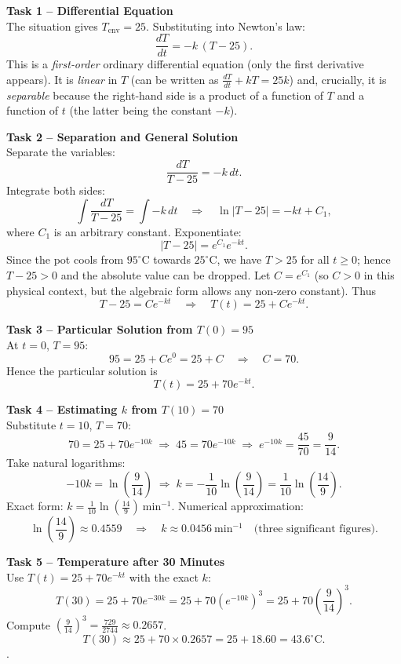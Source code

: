 \documentclass[11pt]{article}
\newcounter{popsec}
\newcounter{popsub}
\newcommand{\courssub}[1]{%
  \stepcounter{popsub}%
  \par\vspace{9pt}\noindent{\popxbold\fontsize{11.5}{13}\selectfont\color{popink}{\color{poporange}\thepopsec.\thepopsub}\hspace{6pt}#1}\par\nopagebreak\vspace{4pt}
}
\begin{document}
\courssub{Model Answer}
\begin{exemplebox}
\textbf{Task 1 – Differential Equation}\\
The situation gives $T_{\text{env}} = 25$. Substituting into Newton's law:
\[
\frac{dT}{dt} = -k\,(T - 25).
\]
This is a \emph{first‑order} ordinary differential equation (only the first derivative appears). It is \emph{linear} in $T$ (can be written as $\frac{dT}{dt} + kT = 25k$) and, crucially, it is \emph{separable} because the right‑hand side is a product of a function of $T$ and a function of $t$ (the latter being the constant $-k$).

\textbf{Task 2 – Separation and General Solution}\\
Separate the variables:
\[
\frac{dT}{T - 25} = -k\,dt.
\]
Integrate both sides:
\[
\int \frac{dT}{T - 25} = \int -k\,dt \quad\Longrightarrow\quad \ln|T - 25| = -kt + C_1,
\]
where $C_1$ is an arbitrary constant. Exponentiate:
\[
|T - 25| = e^{C_1} e^{-kt}.
\]
Since the pot cools from $95^\circ\mathrm{C}$ towards $25^\circ\mathrm{C}$, we have $T > 25$ for all $t \ge 0$; hence $T-25 > 0$ and the absolute value can be dropped. Let $C = e^{C_1}$ (so $C > 0$ in this physical context, but the algebraic form allows any non‑zero constant). Thus
\[
T - 25 = C e^{-kt} \quad\Longrightarrow\quad \boxed{T(t) = 25 + C e^{-kt}}.
\]

\textbf{Task 3 – Particular Solution from $T(0)=95$}\\
At $t=0$, $T=95$:
\[
95 = 25 + C e^{0} = 25 + C \quad\Longrightarrow\quad C = 70.
\]
Hence the particular solution is
\[
\boxed{T(t) = 25 + 70 e^{-kt}}.
\]

\textbf{Task 4 – Estimating $k$ from $T(10)=70$}\\
Substitute $t=10$, $T=70$:
\[
70 = 25 + 70 e^{-10k} \;\Longrightarrow\; 45 = 70 e^{-10k} \;\Longrightarrow\; e^{-10k} = \frac{45}{70} = \frac{9}{14}.
\]
Take natural logarithms:
\[
-10k = \ln\!\left(\frac{9}{14}\right) \;\Longrightarrow\; k = -\frac{1}{10}\ln\!\left(\frac{9}{14}\right) = \frac{1}{10}\ln\!\left(\frac{14}{9}\right).
\]
Exact form: $\displaystyle k = \frac{1}{10}\ln\!\left(\frac{14}{9}\right)\ \mathrm{min}^{-1}$.
Numerical approximation:
\[
\ln\!\left(\frac{14}{9}\right) \approx 0.4559 \quad\Longrightarrow\quad k \approx 0.0456\ \mathrm{min}^{-1} \quad\text{(three significant figures)}.
\]

\textbf{Task 5 – Temperature after 30 Minutes}\\
Use $T(t) = 25 + 70 e^{-kt}$ with the exact $k$:
\[
T(30) = 25 + 70 e^{-30k} = 25 + 70 \left(e^{-10k}\right)^3 = 25 + 70 \left(\frac{9}{14}\right)^3.
\]
Compute $\left(\frac{9}{14}\right)^3 = \frac{729}{2744} \approx 0.2657$.
\[
T(30) \approx 25 + 70 \times 0.2657 = 25 + 18.60 = 43.6^\circ\mathrm{C}.
\]
.


\end{exemplebox}
\end{document}
